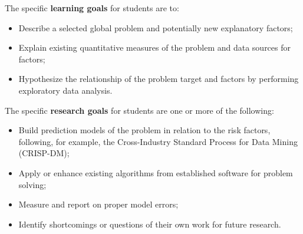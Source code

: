 The specific {\bf learning goals} for students are to:
\begin{itemize}[leftmargin=.5cm] \vspace{-1ex}
    \item Describe a selected global problem and potentially new explanatory factors;
   \item  Explain existing quantitative measures of the problem  and data sources for factors;
    \item Hypothesize the relationship of the problem target and factors by performing exploratory data analysis.
\end{itemize}
The specific {\bf research goals} for students are one or more of the following:
\begin{itemize}[leftmargin=.5cm] \vspace{-1ex}
    \item Build prediction models of the problem in relation to the risk factors, following, for example, the Cross-Industry Standard Process for Data Mining (CRISP-DM);
    \item Apply or enhance existing  algorithms from established software for  problem solving;
    \item Measure and report on proper model errors;
    \item Identify shortcomings or questions of their own work for future research.
\end{itemize}